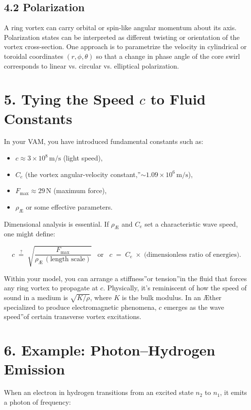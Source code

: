 \subsection*{4.2 Polarization}
A ring vortex can carry orbital or spin-like angular momentum about its axis. Polarization states can be interpreted as different twisting or orientation of the vortex cross-section. One approach is to parametrize the velocity in cylindrical or toroidal coordinates \((r,\phi,\theta)\) so that a change in phase angle of the core swirl corresponds to linear vs. circular vs. elliptical polarization.

\section*{5. Tying the Speed \(c\) to Fluid Constants}
In your VAM, you have introduced fundamental constants such as:

\begin{itemize}
 \item \(c \approx 3\times10^8\,\mathrm{m/s}\) (light speed),
 \item \(C_e\) (the \grqq vortex angular-velocity constant,\textquotedblright \(\sim 1.09\times10^6\,\mathrm{m/s}\)),
 \item \(F_{\max} \approx 29\,\mathrm{N}\) (maximum force),
 \item \(\rho_{\scriptscriptstyle\mathrm{Æ}}\) or some effective parameters.
\end{itemize}

Dimensional analysis is essential. If \(\rho_{\scriptscriptstyle \mathrm{Æ}}\) and \(C_e\) set a characteristic wave speed, one might define:

\[
 c \;\stackrel{?}{=}\; \sqrt{ \frac{F_{\max}}{\rho_{\scriptscriptstyle \mathrm{Æ}}\,(\text{length scale})} } \;\;\;\text{or}\;\;\; c \;=\; C_e \;\times\; \bigl(\text{dimensionless ratio of energies}\bigr).
\]

Within your model, you can arrange a \grqq stiffness\textquotedblright or \grqq tension\textquotedblright in the fluid that forces any ring vortex to propagate at \(c\). Physically, it's reminiscent of how the speed of sound in a medium is \(\sqrt{K/\rho}\), where \(K\) is the bulk modulus. In an Æther specialized to produce electromagnetic phenomena, \(c\) emerges as the \grqq wave speed\textquotedblright of certain transverse vortex excitations.

\section*{6. Example: Photon–Hydrogen Emission}
When an electron in hydrogen transitions from an excited state \(n_2\) to \(n_1\), it emits a photon of frequency:

